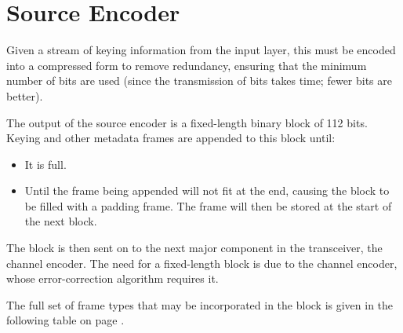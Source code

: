 \documentclass[a4paper]{tufte-handout}
\begin{document}
\section{Source Encoder}
Given a stream of keying information from the input layer, this must be encoded into a compressed form to remove redundancy, ensuring that the minimum number of bits are used (since the transmission of bits takes time; fewer bits are better).

The output of the source encoder is a fixed-length binary block of 112 bits. Keying and other metadata frames are appended to this block until:
\begin{itemize}
    \setlength\itemsep{-0.5em}
	\item It is full.
	\item Until the frame being appended will not fit at the end, causing the block to be filled with a padding frame. The frame will then be stored at the start of the next block.
\end{itemize}
The block is then sent on to the next major component in the transceiver, the channel encoder.
The need for a fixed-length block is due to the channel encoder, whose error-correction algorithm requires it.

The full set of frame types that may be incorporated in the block is given in the following table on page \pageref{table:frame-types}.
\end{document}
